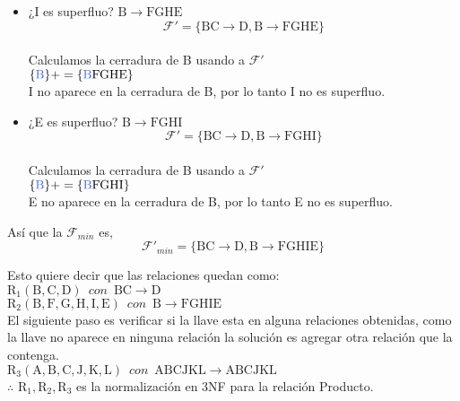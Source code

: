 \documentclass[10pt]{article}
\begin{document}
\begin{itemize}
	\item ¿I es superfluo? $\mathrm{B \rightarrow FGHE}$ \\
	$$\mathcal{F}'=\mathrm{\{ BC \rightarrow D, B \rightarrow FGHE \}}$$\\
	Calculamos la cerradura de B usando a $\mathcal{F}'$\\
	$\mathrm{\{\textcolor{RoyalBlue}{B}\}+= \{\textcolor{RoyalBlue}{B}FGHE\}}$\\
	
	I no aparece en la cerradura de B, por lo tanto I no es superfluo.
	
	\item ¿E es superfluo? $\mathrm{B \rightarrow FGHI}$ \\
	$$\mathcal{F}'=\mathrm{\{ BC \rightarrow D, B \rightarrow FGHI \}}$$\\
	Calculamos la cerradura de B usando a $\mathcal{F}'$\\
	$\mathrm{\{\textcolor{RoyalBlue}{B}\}+= \{\textcolor{RoyalBlue}{B}FGHI\}}$\\
	
	E no aparece en la cerradura de B, por lo tanto E no es superfluo.\\
	
\end{itemize}	
	Así que la $\mathcal{F}_{min}$ es,\\
	
	$$\mathcal{F}'_{min}= \mathrm{\{ BC \rightarrow D, B \rightarrow FGHIE \}}$$
	
	Esto quiere decir que las relaciones quedan como: \\
	
	$\mathrm{R_1(B,C,D)}\,\,\, con \,\,\, \mathrm{ BC \rightarrow D}$\\
	$\mathrm{R_2(B,F, G, H, I, E)}\,\,\, con \,\,\, \mathrm{ B \rightarrow FGHIE}$\\
	
	El siguiente paso es verificar si la llave esta en alguna relaciones obtenidas, como la llave no aparece en ninguna relación la solución es agregar otra relación que la contenga.\\
	
	
	$\mathrm{R_3(A,B,C,J,K,L)}\,\,\, con \,\,\, \mathrm{ ABCJKL \rightarrow ABCJKL}$\\


   $\therefore \,\, \mathrm{R_1, R_2, R_3} $  es la normalización en 3NF para la relación Producto. 
	
\end{document}
